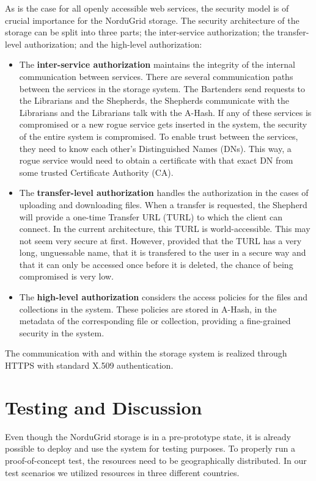 \documentclass{llncs}
\begin{document}
As is the case for all openly accessible web services, the security
model is of crucial importance for the NorduGrid storage. The security
architecture of the storage can be split into three parts; the
inter-service authorization; the transfer-level authorization; and the
high-level authorization:
\begin{itemize}
\item The \textbf{inter-service authorization} maintains the integrity of the
  internal communication between services. There are several
  communication paths between the services in the storage system. The
  Bartenders send requests to the Librarians and the Shepherds, the
  Shepherds communicate with the Librarians and the Librarians talk with
  the A-Hash. If any of these services is compromised or a new
  rogue service gets inserted in the system, the security of the
  entire system is compromised. To enable trust between the services,
  they need to know each other's Distinguished Names (DNs). This way,
  a rogue service would need to obtain a certificate with that exact
  DN from some trusted Certificate Authority (CA).
\item The \textbf{transfer-level authorization} handles the
  authorization in the cases of uploading and downloading files. When
  a transfer is requested, the Shepherd will provide a one-time
  Transfer URL (TURL) to which the client can connect. In the
  current architecture, this TURL is world-accessible. This may not seem
  very secure at first. However, provided that the TURL has a very long,
  unguessable name, that it is transfered to the user in a secure way
  and that it can only be accessed once before it is deleted, the
  chance of being compromised is very low.
\item The \textbf{high-level authorization} considers the access
  policies for the files and collections in the system. These policies
  are stored in A-Hash, in the metadata of the corresponding file or
  collection, providing a fine-grained security in the system.
\end{itemize}
The communication with and within the storage system is realized
through HTTPS with standard X.509 authentication.

\section{Testing and Discussion}
\label{Testing and Discussion}

Even though the NorduGrid storage is in a pre-prototype state, it is already
possible to deploy and use the system for testing purposes. To
properly run a proof-of-concept test, the resources need to be
geographically distributed. In our test scenarios we utilized
resources in three different countries.
\end{document}
